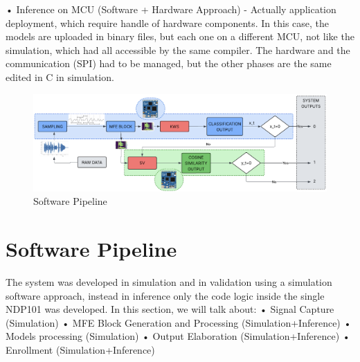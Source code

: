• Inference on MCU (Software + Hardware Approach) - Actually application deployment, which require handle of hardware components. In this case, the models are uploaded in binary files, but each one on a different MCU, not like the simulation, which had all accessible by the same compiler. The hardware and the communication (SPI) had to be managed, but the other phases are the same edited in C in simulation.\newline
\begin{center}
    \centering
    \begin{figure}[!h]
        \includegraphics[width=1.0\textwidth]{images/4.01 Software Pipeline.png}
        \caption{Software Pipeline}
    \end{figure}
\end{center}
\section{Software Pipeline}
\label{sec:sw pipeline}
The system was developed in simulation and in validation using a simulation software approach, instead in inference only the code logic inside the single NDP101 was developed. In this section, we will talk about:\newline
• Signal Capture (Simulation)\newline
• MFE Block Generation and Processing (Simulation+Inference\footnotemark{})\newline
• Models processing (Simulation)\newline
• Output Elaboration (Simulation+Inference)\newline
• Enrollment (Simulation+Inference)
